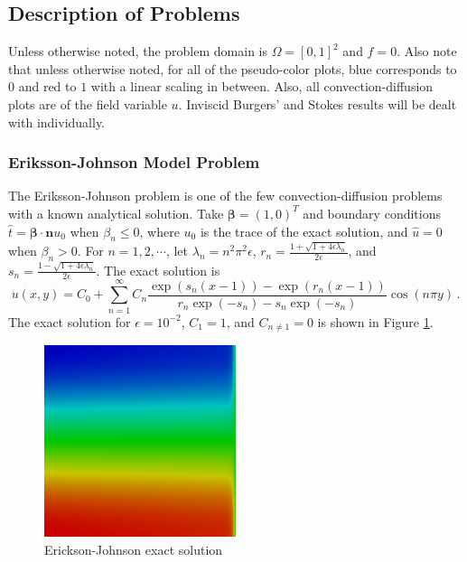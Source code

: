 \documentclass[letterpaper]{article}
\def\bbeta{\boldsymbol\beta}
\begin{document}
\subsection{Description of Problems}\label{sec:problemDescriptions}
Unless otherwise noted, the problem domain is $\Omega=[0,1]^2$ and $f=0$. Also
note that unless otherwise noted, for all of the
pseudo-color plots, blue corresponds to $0$ and red to $1$ with a linear
scaling in between. Also, all convection-diffusion plots are of the field variable $u$.
Inviscid Burgers' and Stokes results will be dealt with individually.

\subsubsection{Eriksson-Johnson Model Problem}
The Eriksson-Johnson problem is one of the few convection-diffusion problems
with a known analytical solution. Take
$\bbeta=(1,0)^T$ and boundary conditions $\hat t=\bbeta\cdot\mathbf{n} u_0$ when
$\beta_n\le0$, where $u_0$ is the trace of the exact solution, and $\hat u=0$
when $\beta_n>0$. For
$n=1,2,\cdots$, let
$\lambda_n=n^2\pi^2\epsilon$,
$r_n=\frac{1+\sqrt{1+4\epsilon\lambda_n}}{2\epsilon}$, and
$s_n=\frac{1-\sqrt{1+4\epsilon\lambda_n}}{2\epsilon}$. The exact solution
is
\begin{equation}
u(x,y)=C_0+\sum_{n=1}^\infty C_n\frac{\exp(s_n(x-1))-\exp(r_n(x-1))}
{r_n\exp(-s_n)-s_n\exp(-s_n)}\cos(n\pi y)\,.
\label{eq:ericksonExact}
\end{equation}
The exact solution for $\epsilon=10^{-2}$, $C_1=1$, and $C_{n\neq1}=0$ is
shown in Figure \ref{fig:erickson}.

\begin{figure}[p]
\centering
\includegraphics[width=0.5\textwidth]{figs/Erickson/exact.png}
\caption{Erickson-Johnson exact solution}
\label{fig:erickson}
\end{figure}
\end{document}
